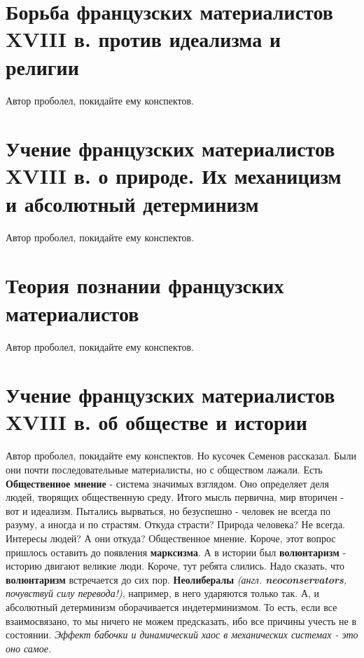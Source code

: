 \section{Борьба французских материалистов XVIII в. против идеализма и религии}
Автор проболел, покидайте ему конспектов.
\section{Учение французских материалистов XVIII в. о природе. Их механицизм и абсолютный детерминизм}
Автор проболел, покидайте ему конспектов.
\section{Теория познании французских материалистов}
Автор проболел, покидайте ему конспектов.
\section{Учение французских материалистов XVIII в.  об обществе и истории}
Автор проболел, покидайте ему конспектов. Но кусочек Семенов рассказал. Были они почти последовательные материалисты, но с обществом лажали. Есть \textbf{Общественное мнение} - система значимых взглядом. Оно определяет деля людей, творящих общественную среду. Итого мысль первична, мир вторичен - вот и идеализм. Пытались вырваться, но безуспешно - человек не всегда по разуму, а иногда и по страстям. Откуда страсти? Природа человека? Не всегда. Интересы людей? А они откуда? Общественное мнение. Короче, этот вопрос пришлось оставить до появления \textbf{марксизма}. А в истории был \textbf{волюнтаризм} - историю двигают великие люди. Короче, тут ребята слились. Надо сказать, что \textbf{волюнтаризм} встречается до сих пор. \textbf{Неолибералы} \textit{(англ. \textbf{neoconservators}, почувствуй силу перевода!)}, например, в него ударяются только так. А, и абсолютный детерминизм оборачивается индетерминизмом. То есть, если все взаимосвязано, то мы ничего не можем предсказать, ибо все причины учесть не в состоянии. \textit{Эффект бабочки и динамический хаос в механических системах - это оно самое. }

